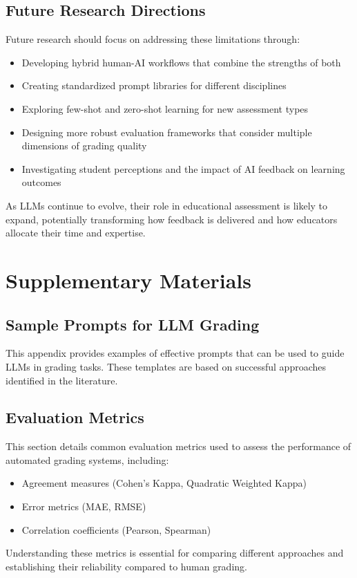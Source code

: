\section{Future Research Directions}
Future research should focus on addressing these limitations through:

\begin{itemize}
\item Developing hybrid human-AI workflows that combine the strengths of both
\item Creating standardized prompt libraries for different disciplines
\item Exploring few-shot and zero-shot learning for new assessment types
\item Designing more robust evaluation frameworks that consider multiple dimensions of grading quality
\item Investigating student perceptions and the impact of AI feedback on learning outcomes
\end{itemize}

As LLMs continue to evolve, their role in educational assessment is likely to expand, potentially transforming how feedback is delivered and how educators allocate their time and expertise.

\appendix
\chapter{Supplementary Materials}\label{app:extra}

\section{Sample Prompts for LLM Grading}\label{app:prompts}
This appendix provides examples of effective prompts that can be used to guide LLMs in grading tasks. These templates are based on successful approaches identified in the literature.

\section{Evaluation Metrics}\label{app:metrics}
This section details common evaluation metrics used to assess the performance of automated grading systems, including:

\begin{itemize}
\item Agreement measures (Cohen's Kappa, Quadratic Weighted Kappa)
\item Error metrics (MAE, RMSE)
\item Correlation coefficients (Pearson, Spearman)
\end{itemize}

Understanding these metrics is essential for comparing different approaches and establishing their reliability compared to human grading.

\nocite{*}


